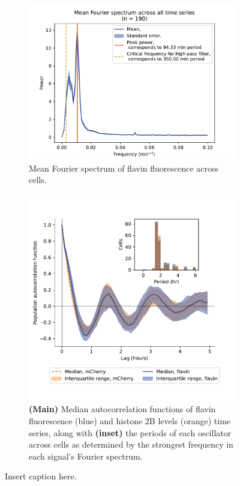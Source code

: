 \begin{figure}
  \centering
  \begin{subfigure}[htpb]{0.4\textwidth}
   \centering
   \includegraphics[width=\textwidth]{htb2mCherry_26643_14}
   \caption{
    Mean Fourier spectrum of flavin fluorescence across cells.
   }
   \label{fig:biology-highglc-sync-fourier}
  \end{subfigure}%
  \begin{subfigure}[htpb]{0.4\textwidth}
   \centering
   \includegraphics[width=\textwidth]{htb2mCherry_26643_12}
   \caption{
     \textbf{(Main)} Median autocorrelation functions of flavin fluorescence (blue) and histone 2B levels (orange) time series,
     along with \textbf{(inset)} the periods of each oscillator across cells as determined by the strongest frequency in each signal's Fourier spectrum.
   }
   \label{fig:biology-highglc-sync-acf}
  \end{subfigure}

  \caption{
    Insert caption here.
  }
  \label{fig:biology-highglc-sync-spectral}
\end{figure}

